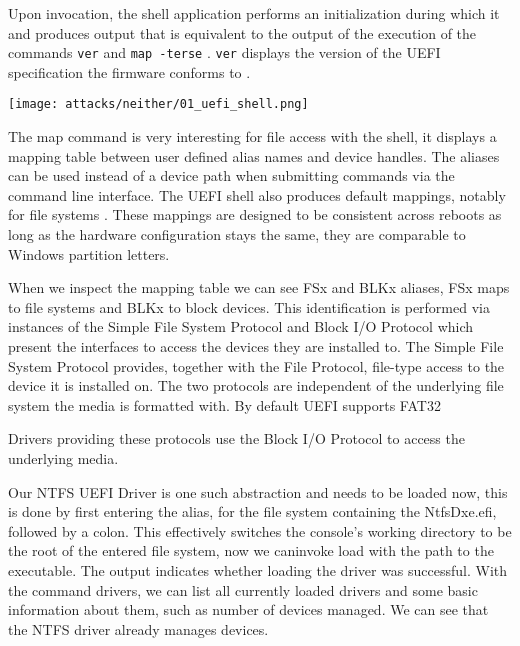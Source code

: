 Upon invocation, the shell application performs an initialization during which it  and produces output that is equivalent to the output of the execution of the commands \lstinline{ver} and \lstinline{map -terse} \cite[3.3 Initialization]{uefi-shell}. \lstinline{ver} displays the version of the UEFI specification the firmware conforms to \cite[5.3 Shell Commands]{uefi-shell}.

\texttt{[image: attacks/neither/01\_uefi\_shell.png]}


The map command is very interesting for file access with the shell, it displays a mapping table between user defined alias names and device handles. The aliases can be used instead of a device path when submitting commands via the command line interface. The UEFI shell also produces default mappings, notably for file systems \cite[3.7.2. Mappings]{uefi-shell}. These mappings are designed to be consistent across reboots as long as the hardware configuration stays the same, they are comparable to Windows partition letters. \cite[Appendix A]{uefi-shell}

\cite[13.3.2 Partition Disocvery]{uefi-spec}
When we inspect the mapping table we can see FSx and BLKx aliases, FSx maps to file systems and BLKx to block devices. This identification is performed via instances of the Simple File System Protocol and  Block I/O Protocol which present the interfaces to access the devices they are installed to.
The Simple File System Protocol \cite[13.4 Simple File System Protocol]{uefi-spec} provides, together with the File Protocol, file-type access to the device it is installed on. The two protocols are independent of the underlying file system the media is formatted with.
By default UEFI supports FAT32

Drivers providing these protocols use the Block I/O Protocol to access the underlying media.


Our NTFS UEFI Driver is one such abstraction and needs to be loaded now, this is done by first entering the alias, for the file system containing the NtfsDxe.efi, followed by a colon.
This effectively switches the console's working directory to be the root of the entered file system, now we caninvoke load with the path to the executable. The output indicates whether loading the driver was successful.
With the command drivers, we can list all currently loaded drivers and some basic information about them, such as number of devices managed. We can see that the NTFS driver already manages devices.


